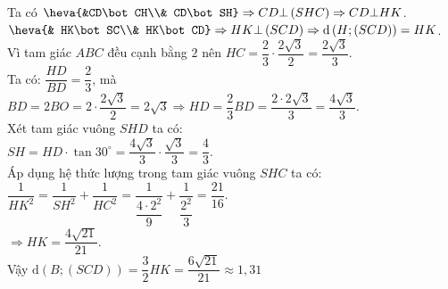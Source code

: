 \begin{ex}
{		Ta có $\heva{&CD\bot CH\\& CD\bot SH} \Rightarrow CD \bot \left(SHC\right)\Rightarrow CD\bot HK$.\\
		$\heva{& HK\bot SC\\& HK\bot CD} \Rightarrow HK\bot \left(SCD\right) \Rightarrow \mathrm{d}\left(H;\left(SCD\right) \right)=HK$.\\
		Vì tam giác $ABC$ đều cạnh bằng $2$ nên $HC=\dfrac{2}{3}\cdot\dfrac{2\sqrt{3}}{2}=\dfrac{2\sqrt{3}}{3}$.\\
		Ta có: $\dfrac{HD}{BD}=\dfrac{2}{3}$, mà $BD=2BO=2\cdot\dfrac{2\sqrt{3}}{2}=2\sqrt{3}\Rightarrow HD=\dfrac{2}{3}BD=\dfrac{2\cdot 2 \sqrt{3}}{3}=\dfrac{4\sqrt{3}}{3}$.\\
		Xét tam giác vuông $SHD$ ta có:\\ $SH=HD\cdot\tan{30^\circ}=\dfrac{4\sqrt{3}}{3}\cdot\dfrac{\sqrt{3}}{3}=\dfrac{4}{3}$.\\
		Áp dụng hệ thức lượng trong tam giác vuông $SHC$ ta có:\\
		$\dfrac{1}{HK^2}=\dfrac{1}{SH^2}+\dfrac{1}{HC^2}=\dfrac{1}{\dfrac{{{4\cdot2}^2}}{9}}+\dfrac{1}{\dfrac{2^2}{3}}=\dfrac{21}{16}$.\\
		$\Rightarrow HK=\dfrac{4\sqrt{21}}{21}$.\\
		Vậy $\mathrm{d}\left(B;\left(SCD\right) \right)=\dfrac{3}{2}HK=\dfrac{6\sqrt{21}}{21}\approx 1{,}31$}
\end{ex}
